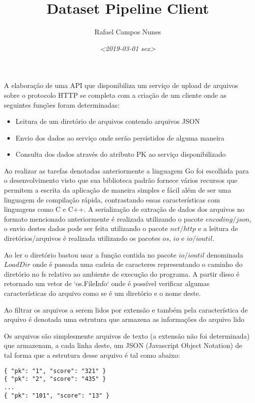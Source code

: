\documentclass[a4paper, 12pt]{article}
\author{Rafael Campos Nunes}
\date{\textit{<2019-03-01 sex>}}
\title{Dataset Pipeline Client}
\begin{document}
\maketitle
\tableofcontents

A elaboração de uma API que disponibiliza um serviço de upload de arquivos sobre
o protocolo HTTP se completa com a criação de um cliente onde as seguintes
funções foram determinadas:

\begin{itemize}
\item Leitura de um diretório de arquivos contendo arquivos JSON
\item Envio dos dados ao serviço onde serão persistidos de alguma maneira
\item Consulta dos dados através do atributo PK ao serviço disponibilizado
\end{itemize}

Ao realizar  as tarefas denotadas anteriormente a linguagem Go foi escolhida
para o desenvolvimento  visto que sua biblioteca padrão fornece vários recursos
que permitem a escrita da aplicação de maneira simples e fácil além de ser uma
linguagem de compilação rápida, contrastando essas características com
linguagens como C e C++. A serialização de extração de dados dos arquivos no
formato mencionado anteriormente é realizada utilizando o pacote \(encoding/json\),
 o envio destes dados pode ser feita utilizando o pacote \(net/http\) e a leitura
de diretórios/arquivos é realizada utilizando os pacotes \(os\), \(io\) e
\(io/ioutil\).

Ao ler o diretório bastou usar a função contida no pacote \(io/ioutil\) denominada
\(LoadDir\) onde é passada uma cadeia de caracteres representando o caminho do
diretório no fs relativo ao ambiente de execução do programa. A partir
disso é retornado um vetor de `os.FileInfo` onde é possível verificar algumas
características do arquivo como se é um diretório e o nome deste.

Ao filtrar os arquivos a serem lidos por extensão e também pela característica
de arquivo é denotada uma estrutura que armazena as informações do arquivo lido

Os arquivos são simplesmente arquivos de texto (a extensão não foi determinada)
que armazenam, a cada linha deste, um JSON (Javascript Object Notation) de tal
forma que a estrutura desse arquivo é tal como abaixo:

\begin{verbatim}
{ "pk": "1", "score": "321" }
{ "pk": "2", "score": "435" }
...
{ "pk": "101", "score": "13" }
\end{verbatim}
\end{document}
